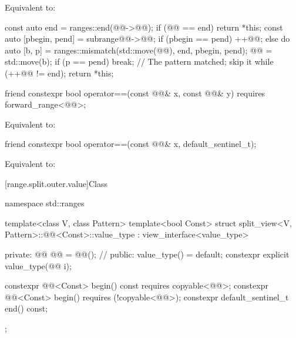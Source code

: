 \begin{itemdescr}
\pnum
\effects
Equivalent to:
\begin{codeblock}
const auto end = ranges::end(@@->@@);
if (@@ == end) return *this;
const auto [pbegin, pend] = subrange{@@->@@};
if (pbegin == pend) ++@@;
else {
  do {
    auto [b, p] = ranges::mismatch(std::move(@@), end, pbegin, pend);
    @@ = std::move(b);
    if (p == pend) {
      break;            // The pattern matched; skip it
    }
  } while (++@@ != end);
}
return *this;
\end{codeblock}
\end{itemdescr}

%
\begin{itemdecl}
friend constexpr bool operator==(const @@& x, const @@& y)
  requires forward_range<@@>;
\end{itemdecl}

\begin{itemdescr}
\pnum
\effects
Equivalent to: 
\end{itemdescr}

%
\begin{itemdecl}
friend constexpr bool operator==(const @@& x, default_sentinel_t);
\end{itemdecl}

\begin{itemdescr}
\pnum
\effects
Equivalent to: 
\end{itemdescr}

[range.split.outer.value]{Class }

%
\begin{codeblock}
namespace std::ranges {
  template<class V, class Pattern>
  template<bool Const>
  struct split_view<V, Pattern>::@@<Const>::value_type
    : view_interface<value_type> {
  private:
    @@ @@ = @@();               // \expos
  public:
    value_type() = default;
    constexpr explicit value_type(@@ i);

    constexpr @@<Const> begin() const requires copyable<@@>;
    constexpr @@<Const> begin() requires (!copyable<@@>);
    constexpr default_sentinel_t end() const;
  };
}
\end{codeblock}

